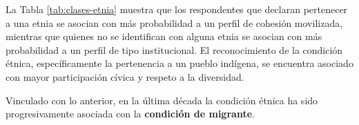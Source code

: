 \documentclass[
  12pt,
]{book}
\begin{document}
\begin{table}

\caption{\label{tab:clases-etnia}Efecto de la pertenencia a una etnia sobre las clases de cohesion social}
\centering
{}
\end{table}

La Tabla \ref{tab:clases-etnia} muestra que los respondentes que declaran pertenecer a una etnia se asocian con más probabilidad a un perfil de cohesión movilizada, mientras que quienes no se identifican con alguna etnia se asocian con más probabilidad a un perfil de tipo institucional. El reconocimiento de la condición étnica, específicamente la pertenencia a un pueblo indígena, se encuentra asociado con mayor participación cívica y respeto a la diversidad.

Vinculado con lo anterior, en la última década la condición étnica ha sido progresivamente asociada con la \textbf{condición de migrante}.

\begin{table}

\caption{\label{tab:clases-nacion}Efecto de la condicion de migracion sobre las clases de cohesion social}
\centering
{}
\end{table}
\end{document}
